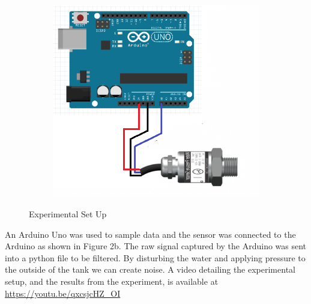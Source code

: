 \documentclass{article}
\begin{document}
\begin{figure}[H]
\centering
\begin{subfigure}{.5\textwidth}
  \centering
  
  \caption{}
  \label{fig:a}
\end{subfigure}%
\begin{subfigure}{.5\textwidth}
  \centering
  \includegraphics[scale=0.45]{pressureCircuit}
  \caption{}
  \label{fig:b}
\end{subfigure}
\caption{Experimental Set Up}
\label{fig:setUp}
\end{figure}
An Arduino Uno was used to sample data and the sensor was connected to the Arduino as shown in Figure 2b. The raw signal captured by the Arduino was sent into a python file to be filtered.
By disturbing the water and applying pressure to the outside of the tank we can create noise. A video detailing the experimental setup, and the results from the experiment, is available at \url{https://youtu.be/qxcsjcHZ_OI}
 
\end{document}
